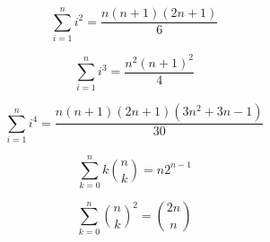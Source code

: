 $$\sum_{i = 1}^{n} i^2 = \frac{n(n + 1)(2n + 1)}{6}$$

$$\sum_{i = 1}^{n} i^3 = \frac{n^2(n + 1)^2}{4}$$

$$\sum_{i = 1}^{n} i^4 = \frac{n(n + 1)(2n + 1)(3n^2 + 3n - 1)}{30}$$

$$\sum_{k = 0}^{n} k \binom{n}{k} = n 2^{n - 1}$$

$$\sum_{k = 0}^{n} \binom{n}{k}^2 = \binom{2n}{n}$$